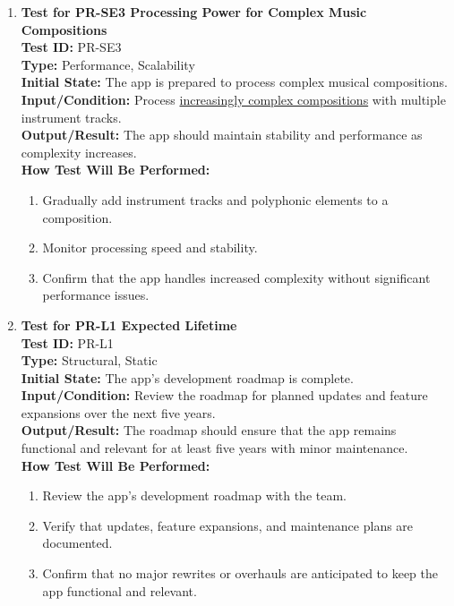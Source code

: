 \documentclass[12pt, titlepage]{article}
\begin{document}
\begin{enumerate}
    \item \textbf{Test for PR-SE3 Processing Power for Complex Music Compositions} \\
      \newline
      \textbf{Test ID:} PR-SE3 \\
      \textbf{Type:} Performance, Scalability \\
      \textbf{Initial State:} The app is prepared to process complex musical compositions. \\
      \textbf{Input/Condition:} Process 
      \href{https://github.com/emilyperica/ScoreGen/tree/main/test/TestingDatasets/piano-samples/sample-chords}{increasingly complex compositions} with multiple instrument tracks. \\
      \textbf{Output/Result:} The app should maintain stability and performance as complexity increases. \\
      \textbf{How Test Will Be Performed:}
      \begin{enumerate}
          \item Gradually add instrument tracks and polyphonic elements to a composition.
          \item Monitor processing speed and stability.
          \item Confirm that the app handles increased complexity without significant performance issues.
      \end{enumerate}

    \item \textbf{Test for PR-L1 Expected Lifetime} \\
      \newline
      \textbf{Test ID:} PR-L1 \\
      \textbf{Type:} Structural, Static \\
      \textbf{Initial State:} The app’s development roadmap is complete. \\
      \textbf{Input/Condition:} Review the roadmap for planned updates and feature expansions over the next five years. \\
      \textbf{Output/Result:} The roadmap should ensure that the app remains functional and relevant for at least five 
      years with minor maintenance. \\
      \textbf{How Test Will Be Performed:}
      \begin{enumerate}
          \item Review the app’s development roadmap with the team.
          \item Verify that updates, feature expansions, and maintenance plans are documented.
          \item Confirm that no major rewrites or overhauls are anticipated to keep the app functional and relevant.
      \end{enumerate}
\end{enumerate}
\end{document}
